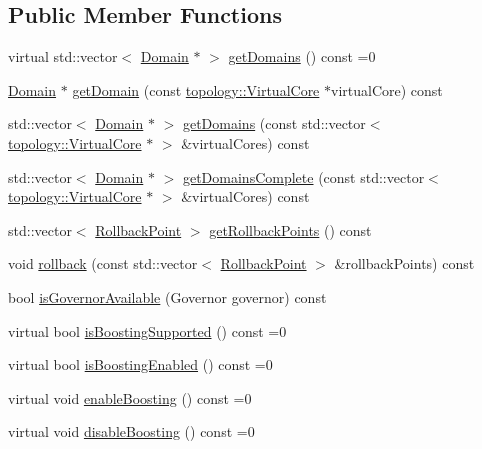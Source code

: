 \subsection*{Public Member Functions}
\begin{DoxyCompactItemize}
\item 
virtual std\-::vector$<$ \hyperlink{classmammut_1_1cpufreq_1_1Domain}{Domain} $\ast$ $>$ \hyperlink{classmammut_1_1cpufreq_1_1CpuFreq_a2ff7cb9b384f506f17340089bba3ba99}{get\-Domains} () const =0
\item 
\hyperlink{classmammut_1_1cpufreq_1_1Domain}{Domain} $\ast$ \hyperlink{classmammut_1_1cpufreq_1_1CpuFreq_a95c0e2150239fe11a9aefca56507e597}{get\-Domain} (const \hyperlink{classmammut_1_1topology_1_1VirtualCore}{topology\-::\-Virtual\-Core} $\ast$virtual\-Core) const 
\item 
std\-::vector$<$ \hyperlink{classmammut_1_1cpufreq_1_1Domain}{Domain} $\ast$ $>$ \hyperlink{classmammut_1_1cpufreq_1_1CpuFreq_a792caa6300834d6d556a1be168c2b347}{get\-Domains} (const std\-::vector$<$ \hyperlink{classmammut_1_1topology_1_1VirtualCore}{topology\-::\-Virtual\-Core} $\ast$ $>$ \&virtual\-Cores) const 
\item 
std\-::vector$<$ \hyperlink{classmammut_1_1cpufreq_1_1Domain}{Domain} $\ast$ $>$ \hyperlink{classmammut_1_1cpufreq_1_1CpuFreq_ad396bc3e3de6f008e929744347ce38d4}{get\-Domains\-Complete} (const std\-::vector$<$ \hyperlink{classmammut_1_1topology_1_1VirtualCore}{topology\-::\-Virtual\-Core} $\ast$ $>$ \&virtual\-Cores) const 
\item 
std\-::vector$<$ \hyperlink{structmammut_1_1cpufreq_1_1RollbackPoint}{Rollback\-Point} $>$ \hyperlink{classmammut_1_1cpufreq_1_1CpuFreq_a08e0675e8404b13d63c09a3fb28f005b}{get\-Rollback\-Points} () const 
\item 
void \hyperlink{classmammut_1_1cpufreq_1_1CpuFreq_ac60f3fe79742135c124746e9e357f277}{rollback} (const std\-::vector$<$ \hyperlink{structmammut_1_1cpufreq_1_1RollbackPoint}{Rollback\-Point} $>$ \&rollback\-Points) const 
\item 
bool \hyperlink{classmammut_1_1cpufreq_1_1CpuFreq_a1fb40924ebe83f5840d8586f71696fef}{is\-Governor\-Available} (Governor governor) const 
\item 
virtual bool \hyperlink{classmammut_1_1cpufreq_1_1CpuFreq_a93c7855b33a6794ddb8ba1aa0d4a5496}{is\-Boosting\-Supported} () const =0
\item 
virtual bool \hyperlink{classmammut_1_1cpufreq_1_1CpuFreq_acc8da4a88e11b5e974a4877e2ff1ef95}{is\-Boosting\-Enabled} () const =0
\item 
virtual void \hyperlink{classmammut_1_1cpufreq_1_1CpuFreq_a53f6662c7cf58861d562266c95a61e8c}{enable\-Boosting} () const =0
\item 
virtual void \hyperlink{classmammut_1_1cpufreq_1_1CpuFreq_a8abff63046f3b4ce5b992d4716fdabd1}{disable\-Boosting} () const =0
\end{DoxyCompactItemize}
